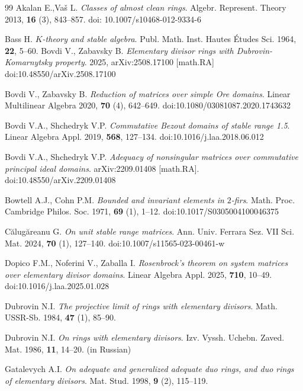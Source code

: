 \documentclass[10pt,a4paper]{amsart}
\theoremstyle{plain}
\theoremstyle{definition}
\begin{document}
\begin{thebibliography}{99}
 Akalan E.,Va\v{s} L. \textit{Classes of almost clean rings}. Algebr. Represent. Theory 2013, \textbf{16} (3), 843--857.
doi: 10.1007/s10468-012-9334-6

 Bass H. \textit{$K$-theory and stable algebra}.
Publ. Math. Inst. Hautes \'{E}tudes Sci. 1964, \textbf{22}, 5--60.
 Bovdi V., Zabavsky B. \textit{Elementary divisor rings with Dubrovin-Komarnytsky property}.
 2025, arXiv:2508.17100 [math.RA] doi:10.48550/arXiv.2508.17100

 Bovdi V., Zabavsky B. \textit{Reduction of matrices over simple Ore domains}.
Linear Multilinear Algebra 2020, \textbf{70} (4), 642--649. doi:10.1080/03081087.2020.1743632

 Bovdi V.A., Shchedryk V.P. \textit{Commutative Bezout domains of stable range 1.5}.
Linear Algebra Appl. 2019, \textbf{568}, 127--134. doi:10.1016/j.laa.2018.06.012

 Bovdi V.A., Shchedryk V.P. \textit{Adequacy of nonsingular matrices over commutative principal ideal domains}.
arXiv:2209.01408 [math.RA]. doi:10.48550/arXiv.2209.01408

 Bowtell A.J., Cohn P.M. \textit{Bounded and invariant elements in $2$-firs}.
Math. Proc. Cambridge Philos. Soc. 1971, \textbf{69} (1), 1--12. doi:10.1017/S0305004100046375

 C\u{a}lug\u{a}reanu G. \textit{On unit stable range matrices}.
Ann. Univ. Ferrara Sez. VII Sci. Mat. 2024, \textbf{70} (1), 127--140. doi:10.1007/s11565-023-00461-w

 Dopico F.M., Noferini V., Zaballa I. \textit{Rosenbrock's theorem on system matrices over elementary divisor domains}.
Linear Algebra Appl. 2025, \textbf{710}, 10--49. doi:10.1016/j.laa.2025.01.028


 Dubrovin N.I. \textit{The projective limit of rings with elementary divisors}.
Math. USSR-Sb. 1984, \textbf{47} (1), 85--90.

 Dubrovin N.I. \textit{On rings with elementary divisors}.
Izv. Vyssh. Uchebn. Zaved. Mat. 1986, \textbf{11}, 14--20. (in Russian)

 Gatalevych A.I. \textit{On adequate and generalized adequate duo rings, and duo rings of elementary divisors}.
Mat. Stud. 1998, \textbf{9} (2), 115--119.


\end{thebibliography}
\end{document}
